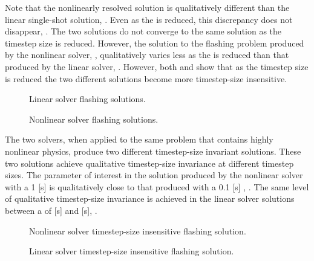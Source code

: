 Note that the nonlinearly resolved solution is qualitatively different than the linear single-shot solution, .
Even as the \dtmax{} is reduced, this discrepancy does not disappear, .
The two solutions do not converge to the same solution as the timestep size is reduced.
However, the solution to the flashing problem produced by the nonlinear solver, , qualitatively varies less as the \dtmax{} is reduced than that produced by the linear solver, .
However, both  and  show that as the timestep size is reduced the two different solutions become more timestep-size insensitive.

\begin{figure}[h!tb]
\centering

\caption{Linear solver flashing solutions.}
\label{fig:flashingAlphaLin}
\end{figure}

\begin{figure}[h!tb]
\centering

\caption{Nonlinear solver flashing solutions.}
\label{fig:flashingAlphaNln}
\end{figure}

The two solvers, when applied to the same problem that contains highly nonlinear physics, produce two different timestep-size invariant solutions.
These two solutions achieve qualitative timestep-size invariance at different timestep sizes.
The parameter of interest in the solution produced by the nonlinear solver with a 1 [s] \dtmax{} is qualitatively close to that produced with a 0.1 [s] \dtmax{}, .
The same level of qualitative timestep-size invariance is achieved in the linear solver solutions between a \dtmax{} of  [s] and  [s], .

\begin{figure}[h!tb]
\centering

\caption{Nonlinear solver timestep-size insensitive flashing solution.}
\label{fig:flashingDtInsensitiveNln}
\end{figure}

\begin{figure}[h!tb]
\centering

\caption{Linear solver timestep-size insensitive flashing solution.}
\label{fig:flashingDtInsensitiveLin}
\end{figure}

